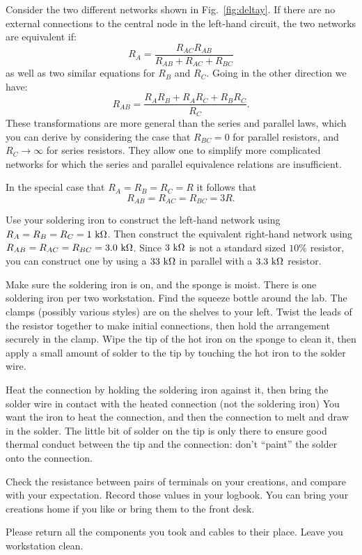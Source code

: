 Consider the two different networks shown in Fig.~\ref{fig:deltay}.
If there are no external connections to the central node in the
left-hand circuit, the two networks are equivalent if:
\begin{displaymath}
R_{A} = \frac{R_{AC} R_{AB}}{R_{AB} + R_{AC} + R_{BC}}
\end{displaymath}
as well as two similar equations for $R_{B}$ and $R_{C}$.  Going in the other direction we have:
\begin{displaymath}
R_{AB} = \frac{R_{A}R_{B} + R_{A}R_{C} + R_{B}R_{C}}{R_{C}}.
\end{displaymath}
These transformations are more general than the series and parallel
laws, which you can derive by considering the case that $R_{BC}=0$ for
parallel resistors, and $R_{C} \to \infty$ for series resistors.  They
allow one to simplify more complicated networks for which the series and
parallel equivalence relations are insufficient.

In the special case that $R_{A} = R_{B} = R_{C} = R$ it follows that 
\begin{displaymath}
R_{AB} = R_{AC} = R_{BC} = 3 R.
\end{displaymath}

Use your soldering iron to construct the left-hand
network using $R_{A} = R_{B} = R_{C} = 1~\rm k\Omega$.  Then construct
the equivalent right-hand network using $R_{AB} = R_{AC} = R_{BC} =
3.0~\rm k\Omega$.  Since $3~\rm k\Omega$ is not a standard sized
$10\%$ resistor, you can construct one by using a $33~\rm k\Omega$ in
parallel with a $3.3~\rm k\Omega$ resistor.

Make sure the soldering iron is on, and the sponge is moist.  There is one soldering iron per two workstation. Find the squeeze bottle around the lab. The clamps (possibly various styles) are on the shelves to your left. Twist
the leads of the resistor together to make initial connections, then
hold the arrangement securely in the clamp.  Wipe the tip of the hot
iron on the sponge to clean it, then apply a small amount of solder to
the tip by touching the hot iron to the solder wire.

Heat the connection by holding the soldering iron against it, then
bring the solder wire in contact with the heated connection (not the
soldering iron) You want the iron to heat the connection, and then the
connection to melt and draw in the solder.  The little bit of solder
on the tip is only there to ensure good thermal conduct between the
tip and the connection: don't ``paint'' the solder onto the
connection.

\begin{measurement} Check the resistance between pairs of terminals on your creations, and
compare with your expectation. Record those values in your logbook. You can bring your creations home if
you like or bring them to the front desk. \end{measurement}

\noindent
Please return all the components you took and cables to their place. Leave you workstation clean. 

